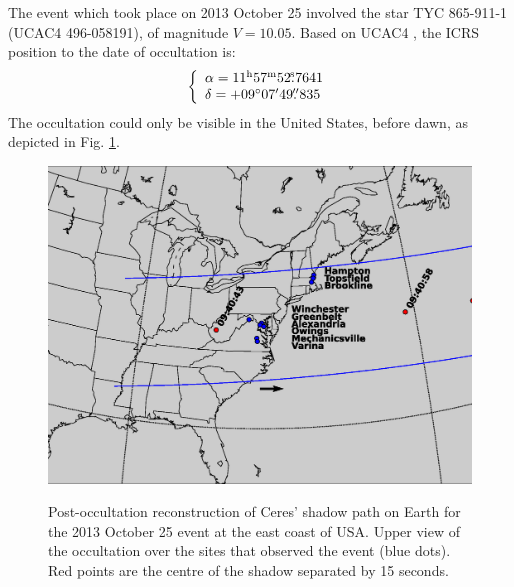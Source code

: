 \documentclass[useAMS,usenatbib]{mn2e}
\begin{document}
The event which took place on 2013 October 25 involved the star TYC 865-911-1 (UCAC4 496-058191), of magnitude $V = 10.05$. Based on UCAC4 \citep{Zacharias2013}, the ICRS position to the date of occultation is:
%
\begin{equation}
\left\{ 
  \begin{array}{l l}
    \alpha = 11^{\rmn{h}}57^{\rmn{m}}52\fs7641\\
    \delta = +09\degr 07\arcmin 49\farcs835
  \end{array}
\right.
\end{equation}
%
The occultation could only be visible in the United States, before dawn, as depicted in Fig. \ref{Fig: Ceres-2013-map}.%

\begin{figure}
{\includegraphics[scale=0.42]{figures/Ceres_2013-zoom.eps}}
\caption{Post-occultation reconstruction of Ceres' shadow path on Earth for the 2013 October 25 event at the east coast of USA. 
Upper view of the occultation over the sites that observed the event (blue dots). Red points are the centre of the shadow separated by 15 seconds.
\label{Fig: Ceres-2013-map}}
\end{figure}
\end{document}
